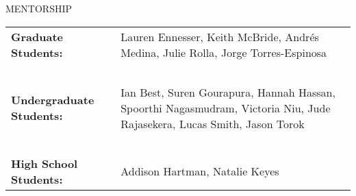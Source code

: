 \documentclass{resume} %
\begin{document}
\newpage

\begin{rSection}{MENTORSHIP}
\begin{table}[h]
\begin{tabularx}{\textwidth}{l X}
 {\bf Graduate Students:}  & Lauren Ennesser, Keith McBride, Andr\'es Medina, Julie Rolla,  \hspace{1cm} Jorge Torres-Espinosa \\
 ~ & ~ \\
{\bf Undergraduate Students:}  & Ian Best, Suren Gourapura, Hannah Hassan, Spoorthi Nagasmudram, Victoria Niu, Jude Rajasekera, Lucas Smith, Jason Torok \\
~ & ~ \\
{\bf High School Students:} &  Addison Hartman, Natalie Keyes\\
\end{tabularx}
\end{table}
\end{rSection}
\end{document}
